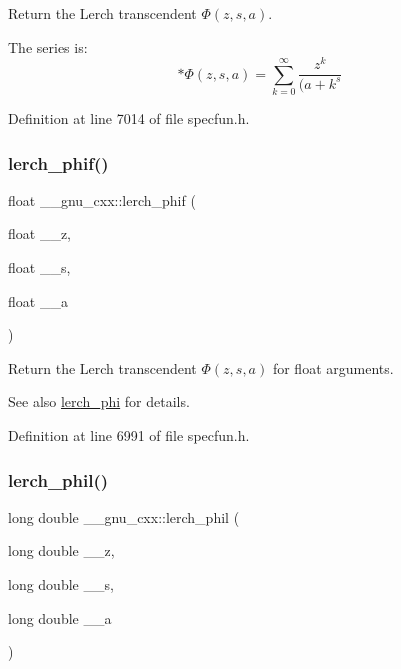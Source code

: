 Return the Lerch transcendent $ \Phi(z,s,a) $.

The series is\+: \[ * \Phi(z,s,a) = \sum_{k=0}^{\infty}\frac{z^k}{(a+k^s} \] 

Definition at line 7014 of file specfun.\+h.

\mbox{\label{group__gnu__math__spec__func_ga90ae3ca570b08b3f458aa83ec2759be3}} 
\subsubsection{\texorpdfstring{lerch\+\_\+phif()}{lerch\_phif()}}
{\footnotesize\ttfamily float \+\_\+\+\_\+gnu\+\_\+cxx\+::lerch\+\_\+phif (\begin{DoxyParamCaption}\item[{float}]{\+\_\+\+\_\+z,  }\item[{float}]{\+\_\+\+\_\+s,  }\item[{float}]{\+\_\+\+\_\+a }\end{DoxyParamCaption})\hspace{0.3cm}{\ttfamily [inline]}}

Return the Lerch transcendent $ \Phi(z,s,a) $ for {\ttfamily float} arguments.

\begin{DoxySeeAlso}{See also}
\hyperlink{group__gnu__math__spec__func_ga31d7cfc601a99d72e58f654d0c890fd6}{lerch\+\_\+phi} for details. 
\end{DoxySeeAlso}


Definition at line 6991 of file specfun.\+h.

\mbox{\label{group__gnu__math__spec__func_gab975fa919ede92ec176330809c16c8d5}} 
\subsubsection{\texorpdfstring{lerch\+\_\+phil()}{lerch\_phil()}}
{\footnotesize\ttfamily long double \+\_\+\+\_\+gnu\+\_\+cxx\+::lerch\+\_\+phil (\begin{DoxyParamCaption}\item[{long double}]{\+\_\+\+\_\+z,  }\item[{long double}]{\+\_\+\+\_\+s,  }\item[{long double}]{\+\_\+\+\_\+a }\end{DoxyParamCaption})\hspace{0.3cm}{\ttfamily [inline]}}


